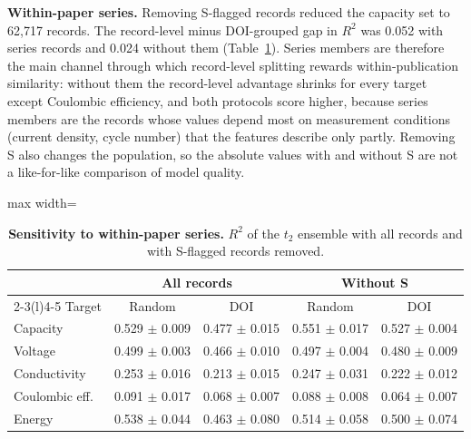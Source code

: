 \documentclass[journal=jcisd8,manuscript=article,layout=traditional]{achemso}
\begin{document}
\textbf{Within-paper series.}\label{sec:series} Removing S-flagged records reduced the capacity set to 62,717 records. The record-level minus DOI-grouped gap in $R^2$ was 0.052 with series records and 0.024 without them (Table~\ref{tab:series}). Series members are therefore the main channel through which record-level splitting rewards within-publication similarity: without them the record-level advantage shrinks for every target except Coulombic efficiency, and both protocols score higher, because series members are the records whose values depend most on measurement conditions (current density, cycle number) that the features describe only partly. Removing S also changes the population, so the absolute values with and without S are not a like-for-like comparison of model quality.

\begin{table}[htbp]
    \centering\small
    \caption{\textbf{Sensitivity to within-paper series.} $R^2$ of the $t_2$ ensemble with all records and with S-flagged records removed.}
    \label{tab:series}
    \begin{adjustbox}{max width=\textwidth}
    \begin{tabular}{@{}lcccc@{}}
        \toprule
        & \multicolumn{2}{c}{All records} & \multicolumn{2}{c}{Without S} \\
        \cmidrule(lr){2-3}\cmidrule(l){4-5}
        Target & Random & DOI & Random & DOI \\
        \midrule
        Capacity       & 0.529 $\pm$ 0.009 & 0.477 $\pm$ 0.015 & 0.551 $\pm$ 0.017 & 0.527 $\pm$ 0.004 \\
        Voltage        & 0.499 $\pm$ 0.003 & 0.466 $\pm$ 0.010 & 0.497 $\pm$ 0.004 & 0.480 $\pm$ 0.009 \\
        Conductivity   & 0.253 $\pm$ 0.016 & 0.213 $\pm$ 0.015 & 0.247 $\pm$ 0.031 & 0.222 $\pm$ 0.012 \\
        Coulombic eff. & 0.091 $\pm$ 0.017 & 0.068 $\pm$ 0.007 & 0.088 $\pm$ 0.008 & 0.064 $\pm$ 0.007 \\
        Energy         & 0.538 $\pm$ 0.044 & 0.463 $\pm$ 0.080 & 0.514 $\pm$ 0.058 & 0.500 $\pm$ 0.074 \\
        \bottomrule
    \end{tabular}
    \end{adjustbox}
\end{table}
\end{document}
